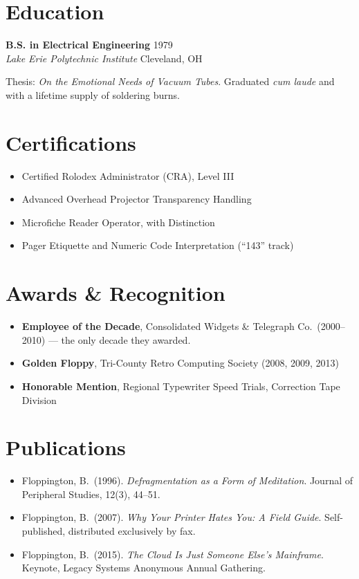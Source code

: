 \documentclass[10pt]{article}
\newcommand{\role}[4]{%
  \textbf{#1} \hfill {\color{muted}#3}\\
  \textit{#2} \hfill {\color{muted}\small #4}\par\vspace{2pt}}
\begin{document}
\section{Education}
\role{B.S. in Electrical Engineering}{Lake Erie Polytechnic Institute}{1979}{Cleveland, OH}
Thesis: \emph{On the Emotional Needs of Vacuum Tubes}. Graduated
\emph{cum laude} and with a lifetime supply of soldering burns.

\section{Certifications}
\begin{itemize}
  \item Certified Rolodex Administrator (CRA), Level III
  \item Advanced Overhead Projector Transparency Handling
  \item Microfiche Reader Operator, with Distinction
  \item Pager Etiquette and Numeric Code Interpretation (``143'' track)
\end{itemize}

\section{Awards \& Recognition}
\begin{itemize}
  \item \textbf{Employee of the Decade}, Consolidated Widgets \& Telegraph Co.\ (2000--2010) --- the only decade they awarded.
  \item \textbf{Golden Floppy}, Tri-County Retro Computing Society (2008, 2009, 2013)
  \item \textbf{Honorable Mention}, Regional Typewriter Speed Trials, Correction Tape Division
\end{itemize}

\section{Publications}
\begin{itemize}
  \item Floppington, B.\ (1996). \emph{Defragmentation as a Form of Meditation}.
        Journal of Peripheral Studies, 12(3), 44--51.
  \item Floppington, B.\ (2007). \emph{Why Your Printer Hates You: A Field Guide}.
        Self-published, distributed exclusively by fax.
  \item Floppington, B.\ (2015). \emph{The Cloud Is Just Someone Else's Mainframe}.
        Keynote, Legacy Systems Anonymous Annual Gathering.
\end{itemize}
\end{document}
